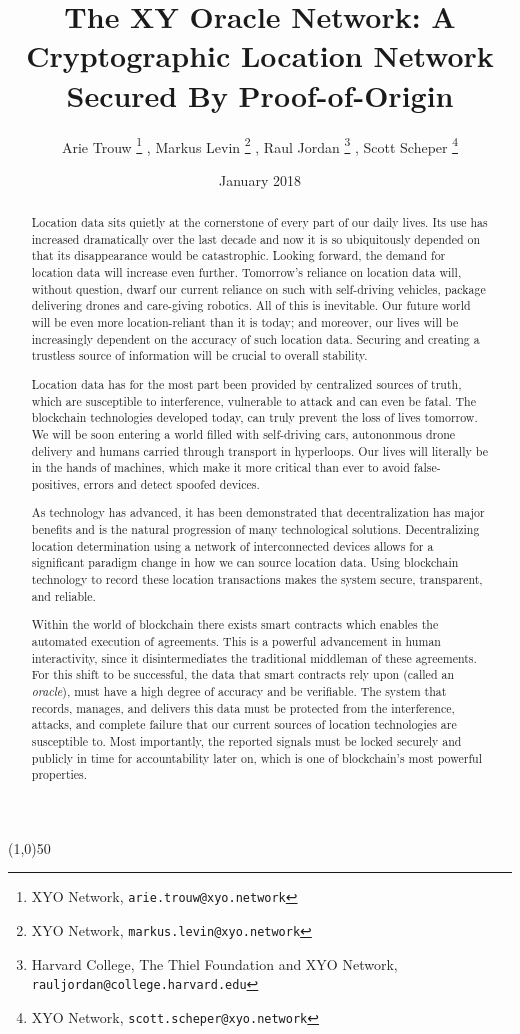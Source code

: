 \documentclass{article}
\title {The XY Oracle Network: A Cryptographic Location Network Secured By Proof-of-Origin}
\author{
	Arie Trouw
		\thanks{XYO Network, \texttt{arie.trouw@xyo.network}}
	, Markus Levin
		\thanks{XYO Network, \texttt{markus.levin@xyo.network}}
	, Raul Jordan
		\thanks{Harvard College, The Thiel Foundation and XYO Network, \texttt{rauljordan@college.harvard.edu}}
	, Scott Scheper
		\thanks{XYO Network, \texttt{scott.scheper@xyo.network}}
}
\date{January 2018}
\begin{document}
\maketitle

\begin{center}
\line(1,0){50}
\end{center}


\begin{abstract}
Location data sits quietly at the cornerstone of every part of our daily lives. Its use has increased dramatically over the last decade and now it is so ubiquitously depended on that its disappearance would be catastrophic. Looking forward, the demand for location data will increase even further. Tomorrow's reliance on location data will, without question, dwarf our current reliance on such with  self-driving vehicles, package delivering drones and care-giving robotics. All of this is inevitable. Our future world will be even more location-reliant than it is today; and moreover, our lives will be increasingly dependent on the accuracy of such location data. Securing and creating a trustless source of information will be crucial to overall stability. 

Location data has for the most part been provided by centralized sources of truth, which are susceptible to interference, vulnerable to attack and can even be fatal. The blockchain technologies developed today, can truly prevent the loss of lives tomorrow. We will be soon entering a world filled with self-driving cars, autononmous drone delivery and humans carried through transport in hyperloops. Our lives will literally be in the hands of machines, which make it more critical than ever to avoid false-positives, errors and detect spoofed devices.

As technology has advanced, it has been demonstrated that decentralization has major benefits and is the natural progression of many technological solutions. Decentralizing location determination using a network of interconnected devices allows for a significant paradigm change in how we can source location data. Using blockchain technology to record these location transactions makes the system secure, transparent, and reliable. 

Within the world of blockchain there exists smart contracts which enables the automated execution of agreements. This is a powerful advancement in human interactivity, since it disintermediates the traditional middleman of these agreements. For this shift to be successful, the data that smart contracts rely upon (called an \textit{oracle}), must have a high degree of accuracy and be verifiable. The system that records, manages, and delivers this data must be protected from the interference, attacks, and complete failure that our current sources of location technologies are susceptible to. Most importantly, the reported signals must be locked securely and publicly in time for accountability later on, which is one of blockchain's most powerful properties.


\end{abstract}
\end{document}
